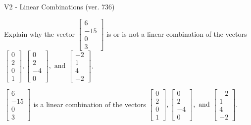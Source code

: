 \begin{exercise}
  \begin{exerciseTitle}V2 - Linear Combinations (ver. 736)\end{exerciseTitle}
  \begin{exerciseStatement}
    Explain why the vector \(\left[\begin{array}{c}
6 \\
-15 \\
0 \\
3
\end{array}\right]\)  is or is not a linear 
	combination of the vectors \(\left[\begin{array}{c}
0 \\
2 \\
0 \\
1
\end{array}\right] , \left[\begin{array}{c}
0 \\
2 \\
-4 \\
0
\end{array}\right] , \text{ and } \left[\begin{array}{c}
-2 \\
1 \\
4 \\
-2
\end{array}\right]\).
	


  \end{exerciseStatement}
  \begin{exerciseAnswer}
   \(\left[\begin{array}{c}
6 \\
-15 \\
0 \\
3
\end{array}\right]\) 
  	 is  
	a linear combination of the vectors \(\left[\begin{array}{c}
0 \\
2 \\
0 \\
1
\end{array}\right] , \left[\begin{array}{c}
0 \\
2 \\
-4 \\
0
\end{array}\right] , \text{ and } \left[\begin{array}{c}
-2 \\
1 \\
4 \\
-2
\end{array}\right]\).

	
  


  \end{exerciseAnswer}
\end{exercise}